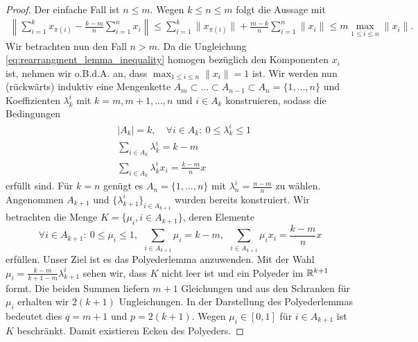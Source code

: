 \begin{proof}
	Der einfache Fall ist $ n \leq m $. Wegen $ k \leq n \leq m $ folgt die Aussage mit
	\begin{align*}
		\left\|
		\sum \limits_{i = 1}^k x_{\pi(i)} - \frac{k-m}{n}
		\sum \limits_{i= 1}^n x_i
		\right\|
		\leq
		\sum \limits_{i = 1}^k \| x_{\pi(i)} \| 
		+
		\frac{m-k}{n} \sum \limits_{i= 1}^n \| x_i \|
		\leq
		m \max_{1 \leq i \leq n} \| x_i \|.
	\end{align*}
	Wir betrachten nun den Fall $ n > m $.
	Da die Ungleichung \eqref{eq:rearrangment_lemma_inequality} homogen bezüglich den Komponenten $ x_i  $ ist, nehmen wir o.B.d.A. an, dass $ \max_{1 \leq i \leq n} \|x_i\| = 1 $ ist.
	Wir werden nun (rückwärts) induktiv eine Mengenkette $ A_m \subset ... \subset A_{n-1} \subset A_{n} = \{1,...,n\}$ und Koeffizienten $ \lambda_k^i $ mit $ k = m,m+1,...,n $ und $ i \in A_k $ konstruieren, sodass die Bedingungen
	\begin{equation}\label{eq:proof_rearrangement_lemma_condition_1}
		\begin{split}
			&|A_k| = k, \quad \forall i \in A_k: \ 0 \leq \lambda^i_k \leq 1 \\
			&\sum \limits_{i \in A_k} \lambda_k^i = k - m\\
			&\sum \limits_{i \in A_k} \lambda_k^i x_i = \frac{k-m}{n} x
		\end{split}
	\end{equation}
	erfüllt sind.
	Für $ k = n  $ genügt es $ A_n = \{1,...,n\} $ mit $ \lambda_n^i = \frac{n-m}{n} $ zu wählen.
	Angenommen $ A_{k+1} $ und $ \{\lambda_{k+1}^i\}_{i \in A_{k+1}} $ wurden bereits konstruiert.
	Wir betrachten die Menge $ K = \{\mu_i , i \in A_{k+1}\} $, deren Elemente 
	\begin{equation}\label{eq:proof_rearrangement_lemma_condition_2}
				\forall i \in A_{k+1}: \ 0 \leq \mu_i \leq 1, \ \
				\sum \limits_{i \in A_{k+1} } \mu_i = k- m, \ \
				\sum \limits_{i \in A_{k+1}} \mu_i x_i = \frac{k-m}{n} x
	\end{equation}
	erfüllen.
	Unser Ziel ist es das Polyederlemma anzuwenden.
	Mit der Wahl $ \mu_i = \frac{k-m}{k+1-m} \lambda_{k+1}^i $ sehen wir, dass $ K $ nicht leer ist und ein Polyeder im $ \mathbb{R}^{k+1} $ formt.
	Die beiden Summen liefern $ m+1 $ Gleichungen und aus den Schranken für $ \mu_i $ erhalten wir $ 2(k+1) $ Ungleichungen. 
	In der Darstellung des Polyederlemmas bedeutet dies $ q = m+1  $ und $ p = 2(k+1) $.
	Wegen $ \mu_i \in [0,1] $ für $ i \in A_{k+1} $ ist $  K $ beschränkt.
	Damit existieren Ecken des Polyeders.

\end{proof}
